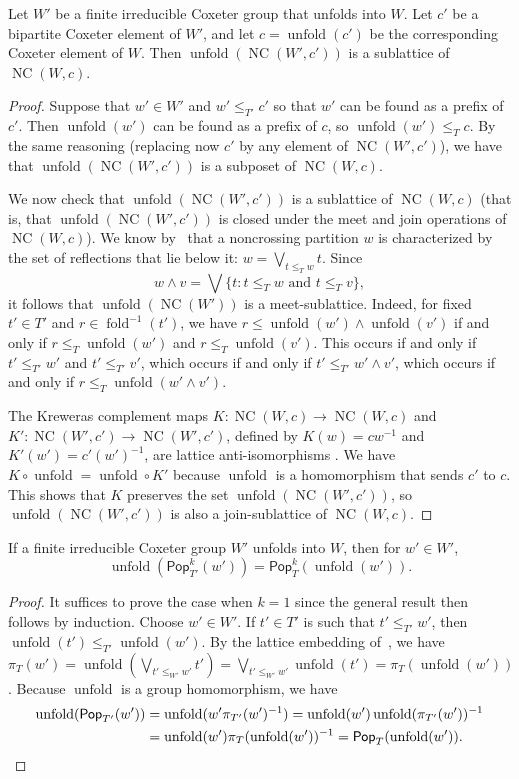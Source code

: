 \documentclass[ALCO,ThmDefs,Unicode,epreuves]{cedram}
\newcommand{\pop}{\mathsf{Pop}}
\newcommand{\U}{{W'}}
\newcommand{\uu}{{w'}}
\DeclareMathOperator{\NC}{NC}
\DeclareMathOperator{\fold}{fold}
\DeclareMathOperator{\unfold}{unfold}
\begin{document}
\begin{lemma}
Let $\U$ be a finite irreducible Coxeter group that unfolds into $W$. Let $c'$ be a bipartite Coxeter element of $\U$, and let $c=\unfold(c')$ be the corresponding Coxeter element of $W$. Then $\unfold(\NC(\U,c'))$ is a sublattice of $\NC(W,c)$.
\label{lem:lattice_embedding}
\end{lemma}
\begin{proof}
Suppose that $w'\in W'$ and $w' \leq_{T'} c'$ so that $\uu$ can be found as a prefix of $c'$. Then $\unfold(\uu)$ can be found as a prefix of $c$, so $\unfold(\uu) \leq_T c$.  By the same reasoning (replacing now $c'$ by any element of $\NC(\U,c')$), we have that $\unfold(\NC(\U,c'))$ is a subposet of $\NC(W,c)$.

We now check that $\unfold(\NC(\U,c'))$ is a sublattice of $\NC(W,c)$ (that is, that $\unfold(\NC(\U,c'))$ is closed under the meet and join operations of $\NC(W,c)$).  We know by~\cite{brady2008non} that a noncrossing partition $w$ is characterized by the set of reflections that lie below it: $w = \bigvee_{t \leq_T w} t$. Since 
\[
w \wedge v = \bigvee\{t : t \leq_T w \text{ and } t \leq_T v\},
\]
 it follows that $\unfold(\NC(\U))$ is a meet-sublattice. Indeed, for fixed $t'\in T'$ and $r \in \fold^{-1}(t')$, we have $r \leq \unfold(w') \wedge \unfold(v')$ if and only if $r \leq_T \unfold(w')$ and $r \leq_T \unfold(v')$. This occurs if and only if $t' \leq_{T'} w'$ and $t' \leq_{T'} v'$, which occurs if and only if $t' \leq_{T'} w' \wedge v'$, which occurs if and only if $r \leq_T \unfold(w' \wedge v')$. 


The Kreweras complement maps $K:\NC(W,c)\to \NC(W,c)$ and $K':\NC(W',c')\to \NC(W',c')$, defined by $K(w)= cw^{-1}$ and $K'(w')=c'(w')^{-1}$, are lattice anti-isomorphisms \cite{armstrong2009generalized}. We have $K\circ\unfold=\unfold\circ K'$ because $\unfold$ is a homomorphism that sends $c'$ to $c$. This shows that $K$ preserves the set $\unfold(\NC(\U,c'))$, so $\unfold(\NC(\U,c'))$ is also a join-sublattice of $\NC(W,c)$.
\end{proof}

\begin{theorem}
\label{thm:pop_embedding}
If a finite irreducible Coxeter group $W'$ unfolds into $W$, then for $w' \in W'$,
\[
\unfold(\pop_{T'}^k(w')) = \pop_T^k(\unfold(w')).
\]
\end{theorem}

\begin{proof}
It suffices to prove the case when $k=1$ since the general result then follows by induction. Choose $w'\in \U$. If $t'\in T'$ is such that $t'\leq_{T'} w'$, then $\unfold(t')\leq_{T'}\unfold(w')$. By the lattice embedding of~, we have $\pi_T(w')=\unfold(\bigvee_{t'\leq_\U \uu} t') = \bigvee_{t'\leq_\U \uu} \unfold(t')=\pi_T(\unfold(\uu))$.
Because $\unfold$ is a group homomorphism, we have \begin{align*}\unfold(\pop_{T'}(\uu))&=\unfold(\uu\pi_{T'}(\uu)^{-1})=\unfold(\uu)\unfold(\pi_{T'}(\uu))^{-1}\\&=\unfold(\uu)\pi_T(\unfold(\uu))^{-1}=\pop_T(\unfold(\uu)).\qedhere\end{align*}
\end{proof}
\end{document}
